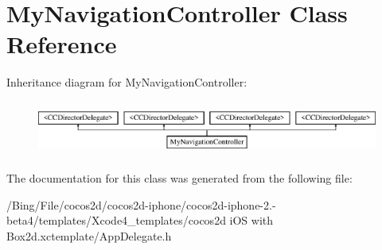 \hypertarget{interface_my_navigation_controller}{\section{My\-Navigation\-Controller Class Reference}
\label{interface_my_navigation_controller}
}
Inheritance diagram for My\-Navigation\-Controller\-:\begin{figure}[H]
\begin{center}
\leavevmode
\includegraphics[height=1.818182cm]{interface_my_navigation_controller}
\end{center}
\end{figure}


The documentation for this class was generated from the following file\-:\begin{DoxyCompactItemize}
\item 
/\-Bing/\-File/cocos2d/cocos2d-\/iphone/cocos2d-\/iphone-\/2.-\/beta4/templates/\-Xcode4\-\_\-templates/cocos2d i\-O\-S with Box2d.\-xctemplate/App\-Delegate.\-h\end{DoxyCompactItemize}
